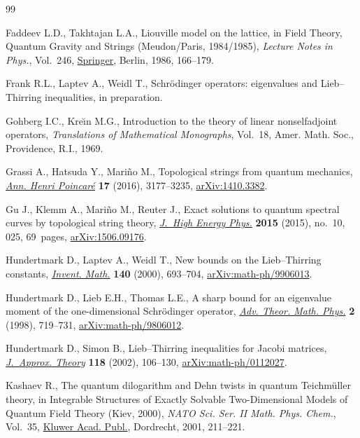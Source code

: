 \documentclass[pdftex]{sigma}%
\numberwithin{equation}{section}
\begin{document}
\begin{thebibliography}{99}
\footnotesize\itemsep=0pt

Faddeev L.D., Takhtajan L.A., Liouville model on the lattice, in Field Theory,
 Quantum Gravity and Strings ({M}eudon/{P}aris, 1984/1985), \textit{Lecture
 Notes in Phys.}, Vol.~246, \href{https://doi.org/10.1007/3-540-16452-9_10}{Springer}, Berlin, 1986, 166--179.

Frank R.L., Laptev A., Weidl T., Schr\"odinger operators: eigenvalues and
 {L}ieb--{T}hirring inequalities, {i}n preparation.

Gohberg I.C., Kre\u{\i}n M.G., Introduction to the theory of linear
 nonselfadjoint operators, \textit{Translations of Mathematical Monographs},
 Vol.~18, Amer. Math. Soc., Providence, R.I., 1969.

Grassi A., Hatsuda Y., Mari\~no M., Topological strings from quantum mechanics,
 \href{https://doi.org/10.1007/s00023-016-0479-4}{\textit{Ann. Henri Poincar\'e}} \textbf{17} (2016), 3177--3235,
 \href{https://arxiv.org/abs/1410.3382}{arXiv:1410.3382}.

Gu J., Klemm A., Mari\~no M., Reuter J., Exact solutions to quantum spectral
 curves by topological string theory, \href{https://doi.org/10.1007/JHEP10(2015)025}{\textit{J.~High Energy Phys.}}
 \textbf{2015} (2015), no.~10, 025, 69~pages, \href{https://arxiv.org/abs/1506.09176}{arXiv:1506.09176}.

Hundertmark D., Laptev A., Weidl T., New bounds on the {L}ieb--{T}hirring
 constants, \href{https://doi.org/10.1007/s002220000077}{\textit{Invent. Math.}} \textbf{140} (2000), 693--704,
 \href{https://arxiv.org/abs/math-ph/9906013}{arXiv:math-ph/9906013}.

Hundertmark D., Lieb E.H., Thomas L.E., A sharp bound for an eigenvalue moment
 of the one-dimensional {S}chr\"odinger operator, \href{https://doi.org/10.4310/ATMP.1998.v2.n4.a2}{\textit{Adv. Theor. Math.
 Phys.}} \textbf{2} (1998), 719--731, \href{https://arxiv.org/abs/math-ph/9806012}{arXiv:math-ph/9806012}.

Hundertmark D., Simon B., Lieb--{T}hirring inequalities for {J}acobi matrices,
 \href{https://doi.org/10.1006/jath.2002.3704}{\textit{J.~Approx. Theory}} \textbf{118} (2002), 106--130, \href{https://arxiv.org/abs/math-ph/0112027}{arXiv:math-ph/0112027}.

Kashaev R., The quantum dilogarithm and {D}ehn twists in quantum
 {T}eichm\"uller theory, in Integrable Structures of Exactly Solvable
 Two-Dimensional Models of Quantum Field Theory ({K}iev, 2000), \textit{NATO
 Sci. Ser. II Math. Phys. Chem.}, Vol.~35, \href{https://doi.org/10.1007/978-94-010-0670-5_13}{Kluwer Acad. Publ.}, Dordrecht,
 2001, 211--221.


\end{thebibliography}
\end{document}

